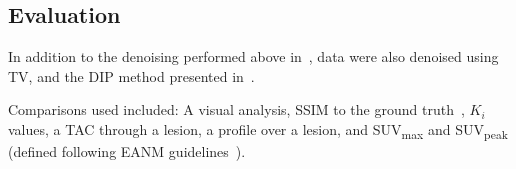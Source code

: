         \subsection{Evaluation} \label{sec:pseudo_bayesian_dip_denoising_as_a_preprocessing_step_for_kinetic_modelling_in_dynamic_pet_appendix_methods_evaluation}
            In addition to the denoising performed above in~, data were also denoised using \gls{TV}, and the \gls{DIP} method presented in~\parencite{Gong2019PETPrior}.
            
            Comparisons used included: A visual analysis, \gls{SSIM} to the ground truth~\parencite{Wang2009MeanMeasures}, $K_i$ values, a \gls{TAC} through a lesion, a profile over a lesion, and \gls{SUV}\textsubscript{max} and \gls{SUV}\textsubscript{peak} (defined following \gls{EANM} guidelines~\parencite{Boellaard2015FDG2.0}).
    
